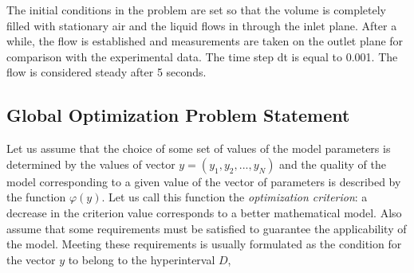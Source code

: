 \documentclass[mathematics,article,submit,pdftex,moreauthors]{Definitions/mdpi}
\begin{document}

The initial conditions in the problem are set so that the volume is completely filled with stationary air and the liquid flows in through the inlet plane. After a while, the flow is established and measurements are taken on the outlet plane for comparison with the experimental data. The time step dt is equal to 0.001. The flow is considered steady after 5 seconds.















\subsection{Global Optimization Problem Statement}
Let us assume that the choice of some set of values of the model parameters is determined by the values of vector $y=(y_1,y_2,...,y_N)$ and the quality of the model corresponding to a given value of the vector of parameters is described by the function $\varphi(y)$. Let us call this function the \textit{optimization criterion}: a decrease in the criterion value corresponds to a better mathematical model. Also assume that some requirements must be satisfied to guarantee the applicability of the model. Meeting these requirements is usually formulated as the condition for the vector $y$ to belong to the hyperinterval $D$,
\end{document}
